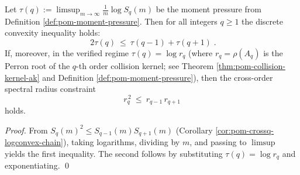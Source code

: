 \begin{corollary}\label{cor:pom-crossq-pressure-convexity}
Let \(\tau(q):=\limsup_{m\to\infty}\frac{1}{m}\log S_q(m)\) be the moment pressure from Definition \ref{def:pom-moment-pressure}.
Then for all integers \(q\ge 1\) the discrete convexity inequality holds:
\[
\boxed{\;
2\tau(q)\ \le\ \tau(q-1)+\tau(q+1)\; }.
\]
If, moreover, in the verified regime \(\tau(q)=\log r_q\) (where \(r_q=\rho(A_q)\) is the Perron root of the \(q\)-th order collision kernel; see Theorem \ref{thm:pom-collision-kernel-ak} and Definition \ref{def:pom-moment-pressure}), then the cross-order spectral radius constraint
\[
\boxed{\;
r_q^{\,2}\ \le\ r_{q-1}\,r_{q+1}\; }
\]
holds.
\end{corollary}
\begin{proof}
From \(S_q(m)^2\le S_{q-1}(m)S_{q+1}(m)\) (Corollary \ref{cor:pom-crossq-logconvex-chain}), taking logarithms, dividing by \(m\), and passing to \(\limsup\) yields the first inequality.
The second follows by substituting \(\tau(q)=\log r_q\) and exponentiating. \qed
\end{proof}

